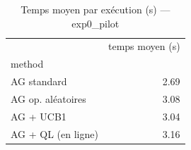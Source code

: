 \begin{table}
\caption{Temps moyen par exécution (s) — exp0_pilot}
\label{tab:temps}
\begin{tabular}{lr}
\toprule
 & temps moyen (s) \\
method &  \\
\midrule
AG standard & 2.69 \\
AG op. aléatoires & 3.08 \\
AG + UCB1 & 3.04 \\
AG + QL (en ligne) & 3.16 \\
\bottomrule
\end{tabular}
\end{table}
